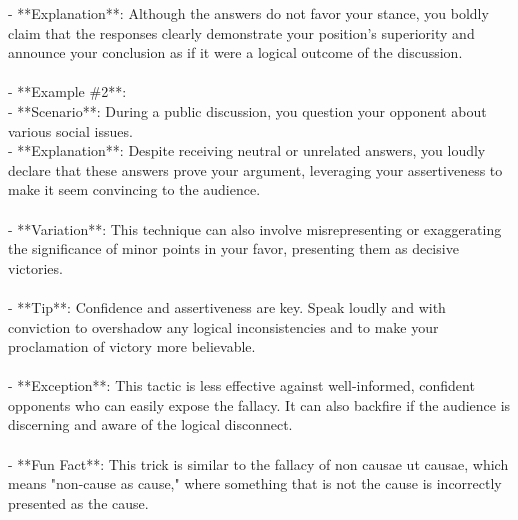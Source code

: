 \documentclass[a4paper,12pt,single,pdftex]{scrbook}
\begin{document}
    
        - **Explanation**: Although the answers do not favor your stance, you boldly claim that the responses clearly demonstrate your position's superiority and announce your conclusion as if it were a logical outcome of the discussion.
    \\

    
      
    \\

    
      - **Example \#2**:
    \\

    
        - **Scenario**: During a public discussion, you question your opponent about various social issues.
    \\

    
        - **Explanation**: Despite receiving neutral or unrelated answers, you loudly declare that these answers prove your argument, leveraging your assertiveness to make it seem convincing to the audience.
    \\

    
      
    \\

    
      - **Variation**: This technique can also involve misrepresenting or exaggerating the significance of minor points in your favor, presenting them as decisive victories.
    \\

    
      
    \\

    
      - **Tip**: Confidence and assertiveness are key. Speak loudly and with conviction to overshadow any logical inconsistencies and to make your proclamation of victory more believable.
    \\

    
      
    \\

    
      - **Exception**: This tactic is less effective against well-informed, confident opponents who can easily expose the fallacy. It can also backfire if the audience is discerning and aware of the logical disconnect.
    \\

    
      
    \\

    
      - **Fun Fact**: This trick is similar to the fallacy of non causae ut causae, which means "non-cause as cause," where something that is not the cause is incorrectly presented as the cause.
    \\
\end{document}
